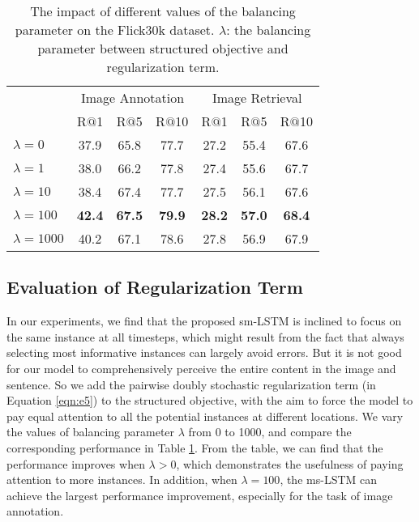 \documentclass[10pt,twocolumn,letterpaper]{article}
\begin{document}
\begin{table}[t] \small
\addtolength{\tabcolsep}{-0.5pt}
\centering
\caption{The impact of different values of the balancing parameter on the Flick30k dataset.
$\lambda$: the balancing parameter between structured objective and regularization term.}
\begin{tabular}{l|ccc|ccc}
\hline
\hline
\multirow{2}{0.7cm}{}     &  \multicolumn{3}{c|}{Image Annotation}  &  \multicolumn{3}{c}{Image Retrieval}   \\
\cline{2-7}
     & R$@$1 & R$@$5  & R$@$10   & R$@$1 & R$@$5  & R$@$10  \\
\hline
\hspace{0mm} $\lambda=0$      &37.9 &65.8 &77.7 &27.2 &55.4 &67.6 \\
\hspace{0mm} $\lambda=1$      &38.0 &66.2 &77.8 &27.4 &55.6 &67.7  \\
\hspace{0mm} $\lambda=10$      &38.4 &67.4 &77.7 &27.5 &56.1 &67.6 \\
\hspace{0mm} $\lambda=100$      &\bf{42.4} &\bf{67.5} &\bf{79.9} &\bf{28.2} &\bf{57.0} &\bf{68.4} \\
\hspace{0mm} $\lambda=1000$      &40.2 &67.1 &78.6 &27.8 &56.9 &67.9 \\

\hline
\hline
\end{tabular}
\label{table:R}
\end{table}




\subsection{Evaluation of Regularization Term}
In our experiments, we find that the proposed sm-LSTM
is inclined to focus on the same instance at all timesteps,
which might result from the fact that always selecting most informative
instances can largely avoid errors.
But it is not good for our model to comprehensively perceive the entire content
in the image and sentence.
So we add the pairwise doubly stochastic regularization term (in Equation \ref{eqn:e5})
to the structured objective,
with the aim to force the model to pay equal attention to all the potential instances at different locations.
We vary the values of balancing parameter $\lambda$ from 0 to 1000,
and compare the corresponding performance in Table \ref{table:R}.
From the table, we can find that the performance improves when $\lambda$$>$$0$,
which demonstrates the usefulness of paying attention to more instances.
In addition, when $\lambda$$=$$100$, the ms-LSTM can achieve the largest performance improvement,
especially for the task of image annotation.
\end{document}
